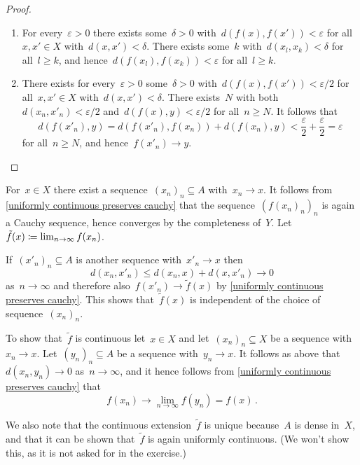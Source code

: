\begin{proof}
  \leavevmode
  \begin{enumerate}
    \item
      For every~$\varepsilon > 0$ there exists some~$\delta > 0$ with~$d(f(x),f(x')) < \varepsilon$ for all~$x, x' \in X$ with~$d(x, x') < \delta$.
      There exists some~$k$ with~$d(x_l, x_k) < \delta$ for all~$l \geq k$, and hence~$d(f(x_l), f(x_k)) < \varepsilon$ for all~$l \geq k$.
    \item
      There exists for every~$\varepsilon > 0$ some~$\delta > 0$ with~$d(f(x),f(x')) < \varepsilon/2$ for all~$x, x' \in X$ with~$d(x,x') < \delta$.
      There exists~$N$ with both~$d(x_n, x'_n) < \varepsilon/2$ and~$d(f(x), y) < \varepsilon/2$ for all~$n \geq N$.
      It follows that
      \[
          d(f(x'_n), y)
        = d(f(x'_n), f(x_n)) + d(f(x_n), y)
        < \frac{\varepsilon}{2} + \frac{\varepsilon}{2}
        = \varepsilon
      \]
      for all~$n \geq N$, and hence~$f(x'_n) \to y$.
    \qedhere
  \end{enumerate}
\end{proof}

For~$x \in X$ there exist a sequence~$(x_n)_n \subseteq A$ with~$x_n \to x$.
It follows from \cref{uniformly continuous preserves cauchy} that the sequence~$(f(x_n)_n)_n$ is again a Cauchy sequence, hence converges by the completeness of~$Y$.
Let~$\tilde{f}(x) \coloneqq \lim_{n \to \infty} f(x_n)$.

If~$(x'_n)_n \subseteq A$ is another sequence with~$x'_n \to x$ then
\[
        d(x_n, x'_n)
  \leq  d(x_n, x) + d(x, x'_n)
  \to   0
\]
as~$n \to \infty$ and therefore also~$f(x'_n) \to \tilde{f}(x)$ by \cref{uniformly continuous preserves cauchy}.
This shows that~$\tilde{f}(x)$ is independent of the choice of sequence~$(x_n)_n$.

To show that~$\tilde{f}$ is continuous let~$x \in X$ and let~$(x_n)_n \subseteq X$ be a sequence with~$x_n \to x$.
Let~$(y_n)_n \subseteq A$ be a sequence with~$y_n \to x$.
It follows as above that~$d(x_n, y_n) \to 0$ as~$n \to \infty$, and it hence follows from \cref{uniformly continuous preserves cauchy} that
\[
      f(x_n)
  \to \lim_{n \to \infty} f(y_n)
  =   f(x) \,.
\]

We also note that the continuous extension~$\tilde{f}$ is unique because~$A$ is dense in~$X$, and that it can be shown that~$\tilde{f}$ is again uniformly continuous.
(We won’t show this, as it is not asked for in the exercise.)





